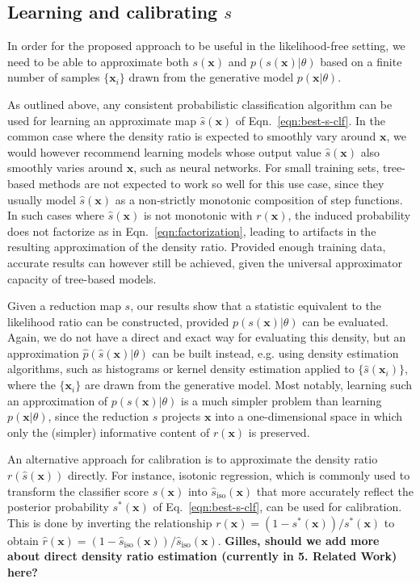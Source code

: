 \documentclass[12pt]{article}
\numberwithin{equation}{section}
\theoremstyle{plain}
\begin{document}
\subsection{Learning and calibrating $s$}\label{s:learning_calibration}

In order for the proposed approach to be useful in the likelihood-free setting,
we need to be able to approximate both $s(\mathbf{x})$ and
$p(s(\mathbf{x})|\theta)$ based on a finite number of samples $\{\mathbf{x}_i\}$
drawn from the generative model $p(\mathbf{x}|\theta)$.

As outlined above, any consistent probabilistic classification algorithm can be
used for learning an approximate  map $\hat{s}(\mathbf{x})$ of
Eqn.~\ref{eqn:best-s-clf}. In the common case where the density ratio is
expected to smoothly vary around $\mathbf{x}$, we would however recommend
learning models whose output value $\hat{s}(\mathbf{x})$ also smoothly varies
around $\mathbf{x}$, such as neural networks. For small training sets, tree-based
methods are not expected to work so well for this use case, since they usually
model $\hat{s}(\mathbf{x})$ as a non-strictly monotonic composition of step functions.
In such cases where $\hat s(\mathbf{x})$ is not monotonic with $r(\mathbf{x})$,
the induced probability does not factorize as in Eqn.~\ref{eqn:factorization},
leading to artifacts in the resulting approximation of the density ratio.
Provided enough training data, accurate results can however still be achieved,
given the universal approximator capacity of tree-based models.

Given a reduction map $s$, our results show that a statistic equivalent to the
likelihood ratio can be constructed, provided $p(s(\mathbf{x})|\theta)$ can be
evaluated. Again, we do not have a direct and exact way for evaluating this
density, but an approximation $\hat p(\hat s(\mathbf{x})| \theta)$ can be built
instead, e.g. using density estimation algorithms, such as
histograms or kernel density estimation applied to $\{\hat
s(\mathbf{x}_i)\}$, where the $\{\mathbf{x}_i\}$  are drawn from the generative
model. Most notably, learning such an approximation of $p(s(\mathbf{x})|\theta)$
is a much simpler problem than learning $p(\mathbf{x}|\theta)$, since the
reduction $s$ projects $\mathbf{x}$ into a one-dimensional space in which only
the (simpler) informative content of $r(\mathbf{x})$ is preserved.

An alternative approach for calibration is to approximate the density ratio
$r(\hat{s}(\mathbf{x}))$ directly.
For instance, isotonic regression, which is commonly used to transform the classifier score  $\hat{s}(\mathbf{x})$ into $\hat{s}_\textrm{iso}(\mathbf{x})$ that more accurately reflect  the posterior probability $s^*(\mathbf{x})$
of Eq.~\ref{eqn:best-s-clf}, can be used for calibration. This is done by inverting the relationship ${r}(\mathbf{x}) = (1-s^*(\mathbf{x}))/s^*(\mathbf{x})$ to obtain $\hat{r}(\mathbf{x}) = (1-\hat{s}_\textrm{iso}(\mathbf{x}))/\hat{s}_\textrm{iso}(\mathbf{x})$.
\textbf{Gilles, should we add more about direct density ratio estimation (currently in 5. Related Work) here?}
\end{document}
